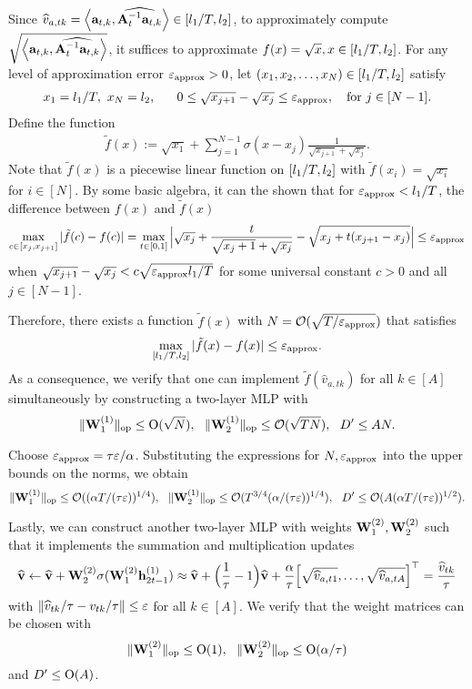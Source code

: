 Since $\widehat v_{a,tk}=\left\langle{\mathbf a}_{t,k},\widehat{{\mathbf A}_t^{-1}{\mathbf a}_{t,k}}\right\rangle\in[{l_1}/T,{l_2}]$, to approximately compute $\sqrt{\left\langle{\mathbf a}_{t,k},\widehat{{\mathbf A}_t^{-1}{\mathbf a}_{t,k}}\right\rangle}$, it suffices to approximate $f(x)=\sqrt{x},x\in[{l_1}/T,{l_2}]$. For any  level of approximation error $\varepsilon_{\mathrm{approx}}>0$, let $(x_1,x_2,\ldots,x_N)\in[{l_1}/T,{l_2}]$ satisfy
\begin{align*}
x_1={l_1}/T,~x_N={l_2},   ~~~~~
    0\leq\sqrt{x_{j+1}}-\sqrt{x_{j}}\leq\varepsilon_{\mathrm{approx}},~~\text{ for }j\in[N-1].
\end{align*}
Define the function
\begin{align*}
    \tilde f(x):=\sqrt{x_1}+\sum_{j=1}^{N-1}\sigma(x-x_{j})\frac{1}{\sqrt{x_{j+1}}+\sqrt{x_j}}.
\end{align*} Note that $\tilde f(x)$ is a piecewise linear function on $[{l_1}/T,{l_2}]$ with $\tilde f(x_i)=\sqrt{x_i}$ for $i\in[N]$. By some basic algebra,  it can the shown that for $\varepsilon_{\mathrm{approx}}<{l_1}/T$, the difference between $f(x)$ and $\tilde f(x)$
\begin{align*}
   \max_{c\in[x_j,x_{j+1}]} |\tilde f(c)-f(c)|=\max_{t\in[0,1]}\Big|\sqrt{x_j}+\frac{t}{\sqrt{x_j+1}+\sqrt{x_j}}-\sqrt{x_j+t(x_{j+1}-x_j)}\Big|\leq\varepsilon_{\mathrm{approx}}
\end{align*} when $\sqrt{x_{j+1}}-\sqrt{x_{j}}<c\sqrt{\varepsilon_{\mathrm{approx}}{l_1}/T}$ for some universal constant $c>0$ and all $j\in[N-1]$.

Therefore,
 there exists a function $\tilde f(x)$ with $N=\mathcal{O}(\sqrt{T/\varepsilon_{\mathrm{approx}}})$ that satisfies $$\max_{[{l_1}/T,{l_2}]}|\tilde f(x)-f(x)|\leq\varepsilon_{\mathrm{approx}}.$$
 As a consequence, we verify that one can implement $\tilde f(\hat v_{a,tk})$ for all $k\in[A]$ simultaneously  by constructing a two-layer MLP with $$\|{{\mathbf W}_1^{(1)}}\|_{\mathrm{op}}\leq {\mathrm{O}}(\sqrt{N}),~~\|{{\mathbf W}_2^{(1)}}\|_{\mathrm{op}}\leq \mathcal{O}(\sqrt{TN}),~~{D'}\leq AN.$$







 Choose $\varepsilon_{{\mathrm{approx}}}={\tau}\varepsilon/\alpha$. Substituting the expressions for $N,\varepsilon_{\mathrm{approx}}$ into the upper bounds on the norms, we obtain
 $$\|{{\mathbf W}_1^{(1)}}\|_{\mathrm{op}}\leq \mathcal{O}(({\alpha T/({\tau}\varepsilon)})^{1/4}),~~\|{{\mathbf W}_2^{(1)}}\|_{\mathrm{op}}\leq \mathcal{O}(T^{3/4}({\alpha/({\tau}\varepsilon)})^{1/4}),~~{D'}\leq \mathcal{O}(A({\alpha T/({\tau}\varepsilon)})^{1/2}).$$


 Lastly, we can construct another two-layer MLP with weights ${\mathbf W}^{(2)}_1,{\mathbf W}^{(2)}_2$ such that it implements the summation and multiplication updates
 \begin{align*}
 \widehat{{\mathbf v}}\leftarrow\widehat{{\mathbf v}}+{\mathbf W}^{(2)}_2\sigma({\mathbf W}^{(2)}_1{\mathbf h}_{2t-1}^{(1)})\approx\widehat{{\mathbf v}}+\Big(\frac1{{\tau}}-1\Big)\widehat{{\mathbf v}}+\frac\alpha{{\tau}}\Big[\sqrt{ \widehat v_{a,t1}},\ldots,\sqrt{ \widehat v_{a,tA}}\Big]^\top=\frac{\widehat v_{tk}}{{\tau}}
 \end{align*}
with $\|\widehat v_{tk}/{\tau}-v_{tk}/{\tau}\|\leq \varepsilon$ for all $k\in[A]$. We verify that the weight matrices can be chosen with
  $$
 \|{{\mathbf W}^{(2)}_1}\|_{\mathrm{op}}\leq {\mathrm{O}}(1),~~ \|{{\mathbf W}^{(2)}_2}\|_{\mathrm{op}}\leq {\mathrm{O}}(\alpha/{\tau})
 $$ and ${D'}\leq {\mathrm{O}}(A)$.

